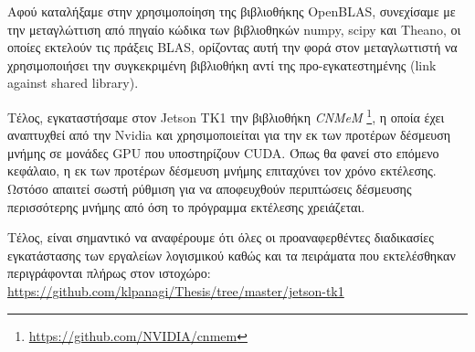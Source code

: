 Αφού καταλήξαμε στην χρησιμοποίηση της βιβλιοθήκης OpenBLAS, συνεχίσαμε
με την μεταγλώττιση από πηγαίο κώδικα των βιβλιοθηκών numpy, scipy και Theano,
οι οποίες εκτελούν τις πράξεις BLAS, ορίζοντας αυτή την φορά στον μεταγλωττιστή
να χρησιμοποιήσει την συγκεκριμένη βιβλιοθήκη αντί της προ-εγκατεστημένης (link against shared library).

Τέλος, εγκαταστήσαμε στον Jetson TK1 την βιβλιοθήκη \emph{CNMeM}
\footnote{\href{https://github.com/NVIDIA/cnmem}{https://github.com/NVIDIA/cnmem}},
η οποία έχει αναπτυχθεί από την Nvidia και χρησιμοποιείται για την εκ των προτέρων
δέσμευση μνήμης σε μονάδες GPU που υποστηρίζουν CUDA.
Όπως θα φανεί στο επόμενο κεφάλαιο, η εκ των προτέρων δέσμευση μνήμης
επιταχύνει τον χρόνο εκτέλεσης. Ωστόσο απαιτεί σωστή ρύθμιση για να
αποφευχθούν περιπτώσεις δέσμευσης περισσότερης μνήμης από όση το
πρόγραμμα εκτέλεσης χρειάζεται.

Τέλος, είναι σημαντικό να αναφέρουμε ότι όλες οι προαναφερθέντες διαδικασίες εγκατάστασης των
εργαλείων λογισμικού καθώς και τα πειράματα που εκτελέσθηκαν περιγράφονται πλήρως στον
ιστοχώρο: %
\\

\href{https://github.com/klpanagi/Thesis/tree/master/jetson-tk1}{https://github.com/klpanagi/Thesis/tree/master/jetson-tk1}


